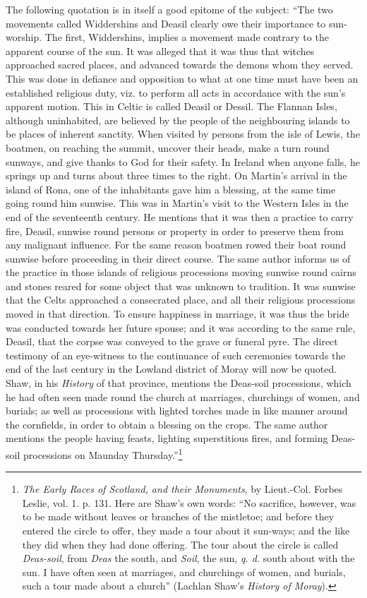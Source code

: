 \documentclass[a4paper, 11pt, oneside, polutonikogreek, english]{article}
\begin{document}
The following quotation is in itself a good epitome of the subject: ``The two movements called Widdershins and Deasil clearly owe their importance to sun-worship. The first, Widdershins, implies a movement made contrary to the apparent course of the sun. It was alleged that it was thus that witches approached sacred places, and advanced towards the demons whom they served. This was done in defiance and opposition to what at one time must have been an established religious duty, viz. to perform all acts in accordance with the sun's apparent motion. This in Celtic is called Deasil or Dessil. The Flannan Isles, although uninhabited, are believed by the people of the neighbouring islands to be places of inherent sanctity. When visited by persons from the isle of Lewis, the boatmen, on reaching the summit, uncover their heads, make a turn round sunways, and give thanks to God for their safety. In Ireland when anyone falls, he springs up and turns about three times to the right. On Martin's arrival in the island of Rona, one of the inhabitants gave him a blessing, at the same time going round him sunwise. This was in Martin's visit to the Western Isles in the end of the seventeenth century. He mentions that it was then a practice to carry fire, Deasil, sunwise round persons or property in order to preserve them from any malignant influence. For the same reason boatmen rowed their boat round sunwise before proceeding in their direct course. The same author informs us of the practice in those islands of religious processions moving sunwise round cairns and stones reared for some object that was unknown to tradition. It was sunwise that the Celts approached a consecrated place, and all their religious processions moved in that direction. To ensure happiness in marriage, it was thus the bride was conducted towards her future spouse; and it was according to the same rule, Deasil, that the corpse was conveyed to the grave or funeral pyre. The direct testimony of an eye-witness to the continuance of such ceremonies towards the end of the last century in the Lowland district of Moray will now be quoted. Shaw, in his \emph{History} of that province, mentions the Deas-soil processions, which he had often seen made round the church at marriages, churchings of women, and burials; as well as processions with lighted torches made in like manner around the cornfields, in order to obtain a blessing on the crops. The same author mentions the people having feasts, lighting superstitious fires, and forming Deas-soil processions on Maunday Thursday.''\footnote{\emph{The Early Races of Scotland, and their Monuments}, by Lieut.-Col. Forbes Leslie, vol. 1. p. 131. Here are Shaw's own words: ``No sacrifice, however, was to be made without leaves or branches of the mistletoe; and before they entered the circle to offer, they made a tour about it sun-ways; and the like they did when they had done offering. The tour about the circle is called \emph{Deas-soil}, from \emph{Deas} the south, and \emph{Soil}, the sun, \emph{q. d.} south about with the sun. I have often seen at marriages, and churchings of women, and burials, such a tour made about a church'' (Lachlan Shaw's \emph{History of Moray}).}
\end{document}
